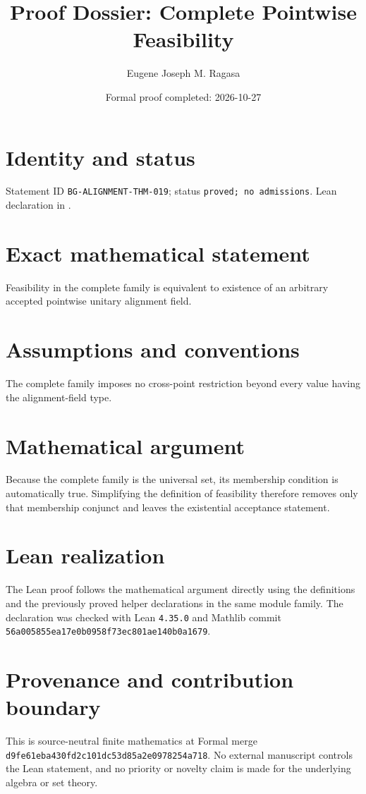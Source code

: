 \documentclass[11pt]{article}
\title{Proof Dossier: Complete Pointwise Feasibility}
\author{Eugene Joseph M. Ragasa}
\date{Formal proof completed: 2026-10-27}
\begin{document}
\raggedright
\maketitle

\section{Identity and status}
Statement ID \texttt{BG-ALIGNMENT-THM-019}; status \texttt{proved; no admissions}.  Lean declaration
 in
.

\section{Exact mathematical statement}
Feasibility in the complete family is equivalent to existence of an arbitrary accepted pointwise unitary alignment field.

\section{Assumptions and conventions}
The complete family imposes no cross-point restriction beyond every value having the alignment-field type.

\section{Mathematical argument}
Because the complete family is the universal set, its membership condition is automatically true.  Simplifying the definition of feasibility therefore removes only that membership conjunct and leaves the existential acceptance statement.

\section{Lean realization}
The Lean proof follows the mathematical argument directly using the definitions and the
previously proved helper declarations in the same module family.  The declaration was checked
with Lean \texttt{4.35.0} and Mathlib commit \texttt{56a005855ea17e0b0958f73ec801ae140b0a1679}.

\section{Provenance and contribution boundary}
This is source-neutral finite mathematics at Formal merge
\texttt{d9fe61eba430fd2c101dc53d85a2e0978254a718}.  No external manuscript controls the Lean statement, and no priority or
novelty claim is made for the underlying algebra or set theory.
\end{document}
